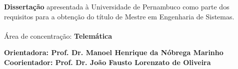 \begin{flushright}
    \vspace{0.5in}
    \parbox{3.50in}
    {\textbf{Dissertação} apresentada à Universidade de Pernambuco como parte dos requisitos para a obtenção do título de Mestre em Engenharia de Sistemas.\\ 
    \\Área de concentração: \textbf{Telemática} }

\end{flushright}

\vspace{1.2ex}

\begin{center}



\vspace{1ex} {\textbf{Orientadora: Prof. Dr. Manoel Henrique da Nóbrega Marinho} }\\
\vspace{1ex} {\textbf{Coorientador: Prof. Dr. João Fausto Lorenzato de Oliveira} }


\vspace{0.2in}
\vspace{18pt}{Recife, Março de 2021.}

\end{center}

